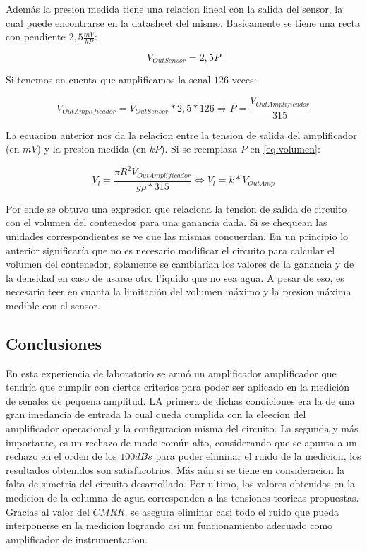 Adem\'as la presion medida tiene una relacion lineal con la salida del sensor, la cual puede encontrarse en la datasheet del mismo. Basicamente se tiene una recta con pendiente $2,5\frac{mV}{kP}$:

\begin{equation}
V_{OutSensor} = 2,5P
\end{equation}

Si tenemos en cuenta que amplificamos la senal $126$ veces:

\begin{equation}
V_{OutAmplificador} = V_{OutSensor}*2,5*126 \Longrightarrow P = \frac{V_{OutAmplificador}}{315}
\end{equation}

La ecuacion anterior nos da la relacion entre la tension de salida del amplificador (en $mV$) y la presion medida (en $kP$). Si se reemplaza $P$ en \ref{eq:volumen}:

\begin{equation}
V_l = \frac{\pi R^2V_{OutAmplificador}}{g\rho*315} \Longleftrightarrow V_l = k*V_{OutAmp}
\end{equation} 

Por ende se obtuvo una expresion que relaciona la tension de salida de circuito con el volumen del contenedor para una ganancia dada. Si se chequean las unidades correspondientes se ve que las mismas concuerdan. En un principio lo anterior significar\'ia que no es necesario modificar el circuito para calcular el volumen del contenedor, solamente se cambiar\'ian los valores de la ganancia y de la densidad en caso de usarse otro l'iquido que no sea agua. A pesar de eso, es necesario teer en cuanta la limitaci\'on del volumen m\'aximo y la presion m\'axima medible con el sensor.


\subsection{Conclusiones}

En esta experiencia de laboratorio se arm\'o un amplificador amplificador que tendr\'ia que cumplir con ciertos criterios para poder ser aplicado en la medici\'on de senales de pequena amplitud. LA primera de dichas condiciones era la de una gran imedancia de entrada la cual queda cumplida con la eleecion del amplificador operacional y la configuracion misma del circuito. La segunda y m\'as importante, es un rechazo de modo com\'un alto, considerando que se apunta a un rechazo en el orden de los $100dBs$ para poder eliminar el ruido de la medicion, los resultados obtenidos son satisfacotrios. M\'as a\'un si se tiene en consideracion la falta de simetria del circuito desarrollado. Por ultimo, los valores obtenidos en la medicion de la columna de agua corresponden a las tensiones teoricas propuestas. Gracias al valor del $CMRR$, se asegura eliminar casi todo el ruido que pueda interponerse en la medicion logrando asi un funcionamiento adecuado como amplificador de instrumentacion.
